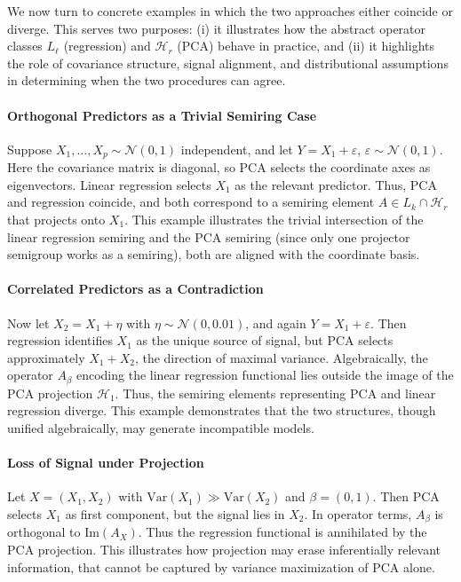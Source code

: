 We now turn to concrete examples in which the two approaches either coincide or diverge. This serves two purposes: (i) it illustrates how the abstract operator classes $L_\ell$ (regression) and $\mathcal{H}_r$ (PCA) behave in practice, and (ii) it highlights the role of covariance structure, signal alignment, and distributional assumptions in determining when the two procedures can agree.

\paragraph{Orthogonal Predictors as a Trivial Semiring Case}

Suppose $X_1, \dots, X_p \sim \mathcal{N}(0,1)$ independent, and let $Y = X_1 + \varepsilon$, $\varepsilon \sim \mathcal{N}(0,1)$. Here the covariance matrix is diagonal, so PCA selects the coordinate axes as eigenvectors. Linear regression selects $X_1$ as the relevant predictor. Thus, PCA and regression coincide, and both correspond to a semiring element $A \in L_k \cap \mathcal{H}_r$ that projects onto $X_1$. This example illustrates the trivial intersection of the linear regression semiring and the PCA semiring (since only one projector semigroup works as a semiring), both are aligned with the coordinate basis.

\paragraph{Correlated Predictors as a Contradiction}

Now let $X_2 = X_1 + \eta$ with $\eta \sim \mathcal{N}(0,0.01)$, and again $Y = X_1 + \varepsilon$. Then regression identifies $X_1$ as the unique source of signal, 
but PCA selects approximately $X_1 + X_2$, the direction of maximal variance. Algebraically, the operator $A_\beta$ encoding the linear regression functional lies outside the image of the PCA projection $\mathcal{H}_1$. Thus, the semiring elements representing PCA and linear regression diverge. This example demonstrates that the two structures, though unified algebraically, may generate incompatible models.

\paragraph{Loss of Signal under Projection}

Let $X = (X_1,X_2)$ with $\mathrm{Var}(X_1)\gg \mathrm{Var}(X_2)$ and $\beta=(0,1)$. Then PCA selects $X_1$ as first component, but the signal lies in $X_2$. In operator terms, $A_\beta$ is orthogonal to $\mathrm{Im}(A_X)$. Thus the regression functional is annihilated by the PCA projection. This illustrates how projection may erase inferentially relevant information, that cannot be captured by variance maximization of PCA alone.

